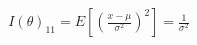 \documentclass[preview]{standalone}
\begin{document}
\begin{align*}
I(\theta)_{11} = E\left[\left(\frac{x-\mu}{\sigma^2}\right)^2\right] = \frac{1}{\sigma^2}
\end{align*}
\end{document}

